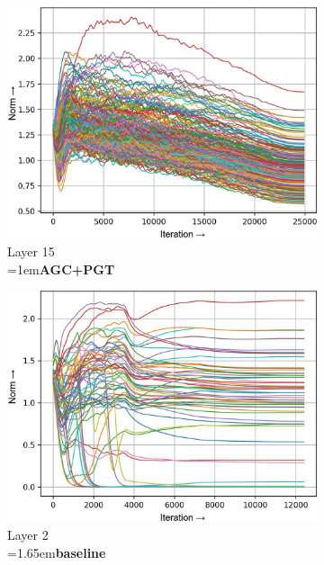 \documentclass[runningheads]{llncs}
\newcommand{\forceindenta}{\parindent=1em\indent\parindent=0pt\relax}
\newcommand{\forceindentb}{\parindent=1.65em\indent\parindent=0pt\relax}
\begin{document}
\begin{figure}[t]
\begin{subfigure}[t]{0.16\textwidth}
\includegraphics[width=\textwidth]{trimmed/agc_pgt-w-layer-5-3}
\caption{Layer 15\\ \forceindenta\textbf{AGC+PGT}}
\end{subfigure}
\begin{subfigure}[t]{0.16\textwidth}
\includegraphics[width=\textwidth]{trimmed/baseline-w-layer-1-2}
\caption{Layer 2\\ \forceindentb\textbf{baseline}}
\end{subfigure}
\begin{subfigure}[t]{0.16\textwidth}

\end{subfigure}
\end{figure}
\end{document}
